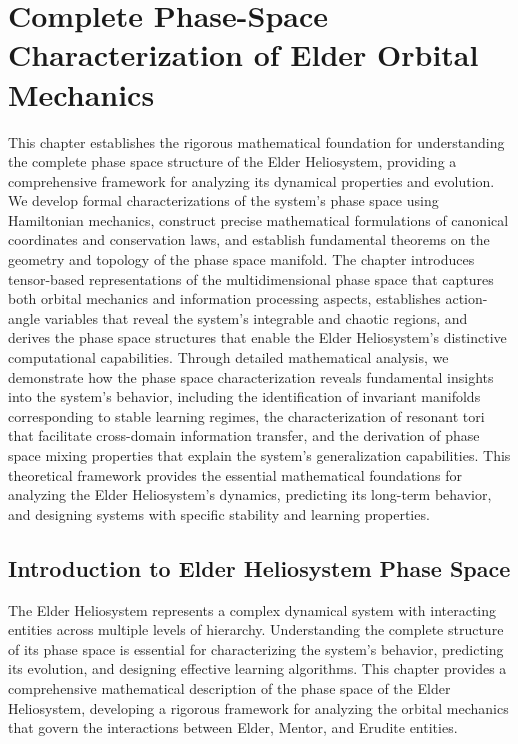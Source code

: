 \chapter{Complete Phase-Space Characterization of Elder Orbital Mechanics}

\begin{tcolorbox}[colback=PureBlue!5!white,colframe=PureBlue!75!black,title=Chapter Summary]
This chapter establishes the rigorous mathematical foundation for understanding the complete phase space structure of the Elder Heliosystem, providing a comprehensive framework for analyzing its dynamical properties and evolution. We develop formal characterizations of the system's phase space using Hamiltonian mechanics, construct precise mathematical formulations of canonical coordinates and conservation laws, and establish fundamental theorems on the geometry and topology of the phase space manifold. The chapter introduces tensor-based representations of the multidimensional phase space that captures both orbital mechanics and information processing aspects, establishes action-angle variables that reveal the system's integrable and chaotic regions, and derives the phase space structures that enable the Elder Heliosystem's distinctive computational capabilities. Through detailed mathematical analysis, we demonstrate how the phase space characterization reveals fundamental insights into the system's behavior, including the identification of invariant manifolds corresponding to stable learning regimes, the characterization of resonant tori that facilitate cross-domain information transfer, and the derivation of phase space mixing properties that explain the system's generalization capabilities. This theoretical framework provides the essential mathematical foundations for analyzing the Elder Heliosystem's dynamics, predicting its long-term behavior, and designing systems with specific stability and learning properties.
\end{tcolorbox}

\section{Introduction to Elder Heliosystem Phase Space}

The Elder Heliosystem represents a complex dynamical system with interacting entities across multiple levels of hierarchy. Understanding the complete structure of its phase space is essential for characterizing the system's behavior, predicting its evolution, and designing effective learning algorithms. This chapter provides a comprehensive mathematical description of the phase space of the Elder Heliosystem, developing a rigorous framework for analyzing the orbital mechanics that govern the interactions between Elder, Mentor, and Erudite entities.

